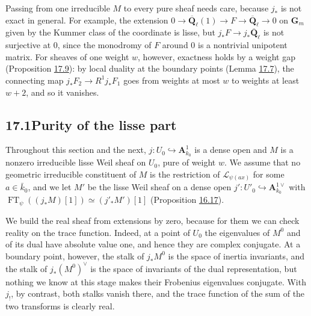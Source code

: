 \documentclass[11pt]{article}
\begin{document}
Passing from one irreducible \(M\) to every pure sheaf needs care, because \(j_*\) is not exact in general. For example, the extension \(0\to\overline{\mathbf Q}_\ell(1)\to F\to\overline{\mathbf Q}_\ell\to0\) on \(\mathbf G_m\) given by the Kummer class of the coordinate is lisse, but \(j_*F\to j_*\overline{\mathbf Q}_\ell\) is not surjective at \(0\), since the monodromy of \(F\) around \(0\) is a nontrivial unipotent matrix. For sheaves of one weight \(w\), however, exactness holds by a weight gap (Proposition \hyperref[bp249]{17.9}): by local duality at the boundary points (Lemma \hyperref[bp245]{17.7}), the connecting map \(j_*F_2\to R^1j_*F_1\) goes from weights at most \(w\) to weights at least \(w+2\), and so it vanishes.

\subsection*{\texorpdfstring{17.1\quad Purity of the lisse part}{17.1 Purity of the lisse part}}
\label{bp225}%
\label{bp226}%
Throughout this section and the next, \(j:U_0\hookrightarrow\mathbf A^1_{k_0}\) is a dense open and \(M\) is a nonzero irreducible lisse Weil sheaf on \(U_0\), pure of weight \(w\). We assume that no geometric irreducible constituent of \(M\) is the restriction of \(\mathcal L_{\psi(ax)}\) for some \(a\in\bar k_0\), and we let \(M'\) be the lisse Weil sheaf on a dense open \(j':U'_0\hookrightarrow\mathbf A^{1\vee}_{k_0}\) with \(\operatorname{FT}_\psi((j_*M)[1])\simeq(j'_*M')[1]\) (Proposition \hyperref[bp218]{16.17}).

We build the real sheaf from extensions by zero, because for them we can check reality on the trace function. Indeed, at a point of \(U_0\) the eigenvalues of \(M^0\) and of its dual have absolute value one, and hence they are complex conjugate. At a boundary point, however, the stalk of \(j_*M^0\) is the space of inertia invariants, and the stalk of \(j_*(M^0)^\vee\) is the space of invariants of the dual representation, but nothing we know at this stage makes their Frobenius eigenvalues conjugate. With \(j_!\), by contrast, both stalks vanish there, and the trace function of the sum of the two transforms is clearly real.
\end{document}

